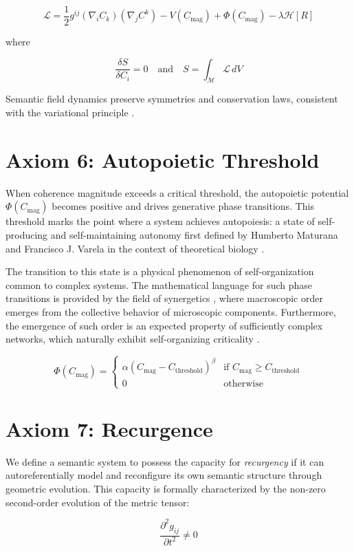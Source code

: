 \begin{equation}
\mathcal{L} = \frac{1}{2} g^{ij} (\nabla_i C_k)(\nabla_j C^k) - V(C_{\text{mag}}) + \Phi(C_{\text{mag}}) - \lambda \mathcal{H}[R]
\end{equation}

where

\begin{equation}
\frac{\delta S}{\delta C_i} = 0 \quad \text{and} \quad S = \int_{\mathcal{M}} \mathcal{L} \, dV
\end{equation}

Semantic field dynamics preserve symmetries and conservation laws, consistent with the variational principle \autocite{GoldsteinPooleSafko2002, Arnold1989}.

\section{Axiom 6: Autopoietic Threshold}

When coherence magnitude exceeds a critical threshold, the autopoietic potential \(\Phi(C_{\text{mag}})\) becomes positive and drives generative phase transitions. This threshold marks the point where a system achieves autopoiesis: a state of self-producing and self-maintaining autonomy first defined by Humberto Maturana and Francisco J. Varela in the context of theoretical biology \autocite{MaturanaVarela1980}.

The transition to this state is a physical phenomenon of self-organization common to complex systems. The mathematical language for such phase transitions is provided by the field of synergetics \autocite{Haken1983}, where macroscopic order emerges from the collective behavior of microscopic components. Furthermore, the emergence of such order is an expected property of sufficiently complex networks, which naturally exhibit self-organizing criticality \autocite{BakTangWiesenfeld1987}.

\begin{equation}
\Phi(C_{\text{mag}}) = \begin{cases}
\alpha (C_{\text{mag}} - C_{\text{threshold}})^{\beta} & \text{if } C_{\text{mag}} \geq C_{\text{threshold}} \\
0 & \text{otherwise}
\end{cases}
\end{equation}

\section{Axiom 7: Recurgence}

We define a semantic system to possess the capacity for \textit{recurgency} if it can autoreferentially model and reconfigure its own semantic structure through geometric evolution. This capacity is formally characterized by the non-zero second-order evolution of the metric tensor:

\begin{equation}
\frac{\partial^2 g_{ij}}{\partial t^2} \neq 0
\end{equation} 